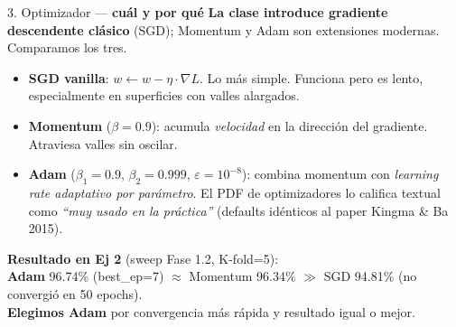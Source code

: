 \documentclass[11pt,aspectratio=169]{beamer}
\begin{document}
\begin{frame}{3. Optimizador — \textbf{cuál y por qué}}
\textbf{La clase introduce gradiente descendente clásico} (SGD); Momentum y Adam son extensiones modernas. Comparamos los tres.\\[0.6em]

\begin{itemize}\setlength\itemsep{0.25em}\small
  \item \textbf{SGD vanilla}: $w \leftarrow w - \eta \cdot \nabla L$. Lo más simple. Funciona pero es lento, especialmente en superficies con valles alargados.
  \item \textbf{Momentum} ($\beta = 0.9$): acumula \emph{velocidad} en la dirección del gradiente. Atraviesa valles sin oscilar.
  \item \textbf{Adam} ($\beta_1 = 0.9$, $\beta_2 = 0.999$, $\varepsilon = 10^{-8}$): combina momentum con \emph{learning rate adaptativo por parámetro}. El PDF de optimizadores lo califica textual como \emph{``muy usado en la práctica''} (defaults idénticos al paper Kingma \& Ba 2015).
\end{itemize}
\vspace{0.6em}

\begin{takeaway}
\textbf{Resultado en Ej 2} (sweep Fase 1.2, K-fold=5): \\
\textbf{Adam} 96.74\% (best\_ep=7) \quad $\approx$ \quad Momentum 96.34\% \quad $\gg$ \quad SGD 94.81\% (no convergió en 50 epochs).\\[0.2em]
\textbf{Elegimos Adam} por convergencia más rápida y resultado igual o mejor.
\end{takeaway}
\end{frame}
\end{document}
